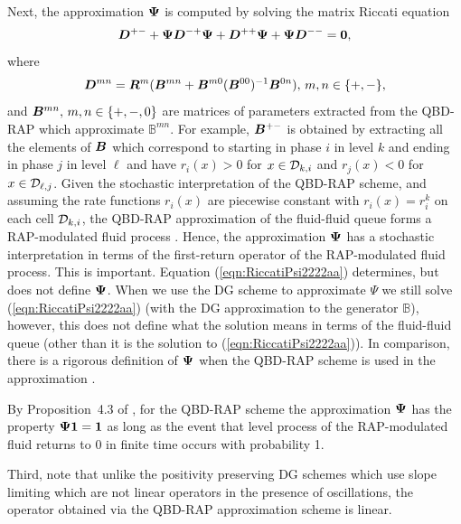 Next, the approximation \(\boldsymbol \Psi\) is computed by solving the matrix Riccati equation 
\begin{align}\label{eqn:RiccatiPsi2222aa}
    \boldsymbol D^{+-}
+ \boldsymbol \Psi   \boldsymbol D^{-+}\boldsymbol \Psi
+   \boldsymbol D^{++}\boldsymbol \Psi
+ \boldsymbol \Psi  \boldsymbol D^{--}
= \boldsymbol 0,
\end{align}
where 
\[\boldsymbol D^{mn} = \boldsymbol{R}^m (\boldsymbol{B}^{mn} + \boldsymbol{B}^{m0}(\boldsymbol B^{00})^{-1}\boldsymbol{B}^{0n}), \, m,n\in\{+,-\},\]
and \(\boldsymbol{B}^{mn},\, m,n\in\{+,-,0\}\) are matrices of parameters extracted from the QBD-RAP which approximate \(\mathbb B^{mn}\). For example, \(\boldsymbol B^{+-}\) is obtained by extracting all the elements of \(\boldsymbol B\) which correspond to starting in phase \(i\) in level \(k\) and ending in phase \(j\) in level \(\ell\) and have \(r_i(x)>0\) for \(x\in\mathcal{D}_{k,i}\) and \(r_j(x)<0\) for \(x\in\mathcal{D}_{\ell,j}\). Given the stochastic interpretation of the QBD-RAP scheme, and assuming the rate functions \(r_i(x)\) are piecewise constant with \(r_i(x)=r_i^k\) on each cell \(\mathcal{D}_{k,i}\), the QBD-RAP approximation of the fluid-fluid queue forms a RAP-modulated fluid process \citep{p2019,bgnp2021}. Hence, the approximation \(\boldsymbol \Psi\) has a stochastic interpretation in terms of the first-return operator of the RAP-modulated fluid process. This is important. Equation (\ref{eqn:RiccatiPsi2222aa}) determines, but does not define \(\boldsymbol \Psi\). When we use the DG scheme to approximate \(\mathbb \Psi\) we still solve (\ref{eqn:RiccatiPsi2222aa}) (with the DG approximation to the generator \(\mathbb B\)), however, this does not define what the solution means in terms of the fluid-fluid queue (other than it is the solution to (\ref{eqn:RiccatiPsi2222aa})). In comparison, there is a rigorous definition of \(\boldsymbol \Psi\) when the QBD-RAP scheme is used in the approximation \citep{p2019,bgnp2021}. 

By Proposition~4.3 of \cite{p2019}, for the QBD-RAP scheme the approximation \(\boldsymbol \Psi\) has the property \(\boldsymbol \Psi \boldsymbol 1=\boldsymbol 1\) as long as the event that level process of the RAP-modulated fluid returns to \(0\) in finite time occurs with probability 1. 

Third, note that unlike the positivity preserving DG schemes which use slope limiting which are not linear operators in the presence of oscillations, the operator obtained via the QBD-RAP approximation scheme is linear.

